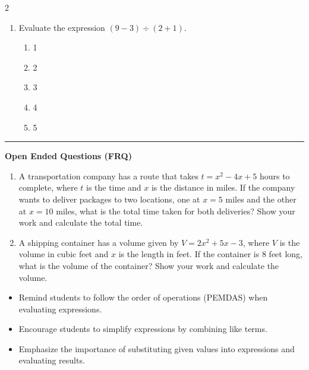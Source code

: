 \documentclass[10pt]{article}
\begin{document}
\begin{multicols}{2}
\begin{enumerate}[label=\textbf{Q\arabic*.}, leftmargin=*, itemsep=6pt, parsep=0pt]
  \item \small Evaluate the expression $(9 - 3) \div (2 + 1)$.
  \begin{enumerate}[label=(\Alph*), leftmargin=0.6cm, nosep, itemsep=2pt]
    \item 1
    \item 2
    \item 3
    \item 4
    \item 5
  \end{enumerate}

\end{enumerate}
\end{multicols}

\vspace{-0.2cm}
\hrule
\vspace{0.2cm}
\textbf{\small Open Ended Questions (FRQ)}
\begin{enumerate}[label=\textbf{Q\arabic*.}, start=9, itemsep=5pt, topsep=0pt]

  \item \small A transportation company has a route that takes $t = x^2 - 4x + 5$ hours to complete, where $t$ is the time and $x$ is the distance in miles. If the company wants to deliver packages to two locations, one at $x = 5$ miles and the other at $x = 10$ miles, what is the total time taken for both deliveries? Show your work and calculate the total time. \vspace{2cm}

  \item \small A shipping container has a volume given by $V = 2x^2 + 5x - 3$, where $V$ is the volume in cubic feet and $x$ is the length in feet. If the container is 8 feet long, what is the volume of the container? Show your work and calculate the volume. \vspace{2cm}

\end{enumerate}

\vfill

\begin{tcolorbox}[colback=blue!5, colframe=mainblue!50, title=\small \textbf{Chef's Tips}, fonttitle=\bfseries, bottom=1mm]
\begin{itemize}[noitemsep, topsep=2pt, leftmargin=0.5cm]
  \item \scriptsize Remind students to follow the order of operations (PEMDAS) when evaluating expressions.\item \scriptsize Encourage students to simplify expressions by combining like terms.\item \scriptsize Emphasize the importance of substituting given values into expressions and evaluating results.
\end{itemize}
\end{tcolorbox}
\end{document}
